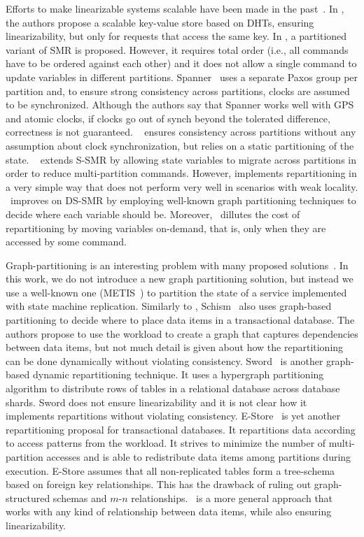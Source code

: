 Efforts to make linearizable systems scalable have been made in the past~\cite{corbett2013spanner, bezerra2014ssmr, hoang2016, Glendenning2011, Marandi11}.
In \cite{Glendenning2011}, the authors propose a scalable key-value store based on DHTs, ensuring linearizability, but only for requests that access the same key. 
In \cite{Marandi11}, a partitioned variant of SMR is proposed.
However, it requires total order (i.e., all commands have to be ordered against each other) and it does not allow a single command to update variables in different partitions.
Spanner~\cite{corbett2013spanner} uses a separate Paxos group per partition and, to ensure strong consistency across partitions, clocks are assumed to be synchronized.
Although the authors say that Spanner works well with GPS and atomic clocks, if clocks go out of synch beyond the tolerated difference, correctness is not guaranteed.
\ssmr{}~\cite{bezerra2014ssmr} ensures consistency across partitions without any assumption about clock synchronization, but relies on a static partitioning of the state.
\dssmr{}~\cite{hoang2016} extends S-SMR by allowing state variables to migrate across partitions in order to reduce multi-partition commands.
However, \dssmr{} implements repartitioning in a very simple way that does not perform very well in scenarios with weak locality.
\dynastar\ improves on DS-SMR by employing well-known graph partitioning techniques to decide where each variable should be.
Moreover, \dynastar\ dillutes the cost of repartitioning by moving variables on-demand, that is, only when they are accessed by some command.

Graph-partitioning is an interesting problem with many proposed solutions~\cite{Abou-Rjeili:2006,kernighan1970efficient,hendrickson2000graph}.
In this work, we do not introduce a new graph partitioning solution, but instead we use a well-known one (METIS~\cite{Abou-Rjeili:2006}) to partition the state of a service implemented with state machine replication.
Similarly to \dynastar{}, Schism~\cite{curino2010sch} also uses graph-based partitioning to decide where to place data items in a transactional database.
The authors propose to use the workload to create a graph that captures dependencies between data items, but not much detail is given about how the repartitioning can be done dynamically without violating consistency.
Sword~\cite{quamar2013sword} is another graph-based dynamic repartitioning technique.
It uses a hypergraph partitioning algorithm to distribute rows of tables in a relational database across database shards.
Sword does not ensure linearizability and it is not clear how it implements repartitions without violating consistency.
E-Store~\cite{taft2014est} is yet another repartitioning proposal for transactional databases.
It repartitions data according to access patterns from the workload.
It strives to minimize the number of multi-partition accesses and is able to redistribute data items among partitions during execution.
E-Store assumes that all non-replicated tables form a tree-schema based on foreign key relationships.
This has the drawback of ruling out graph-structured schemas and \mbox{$m$-$n$} relationships.
\dynastar\ is a more general approach that works with any kind of relationship between data items, while also ensuring linearizability.

